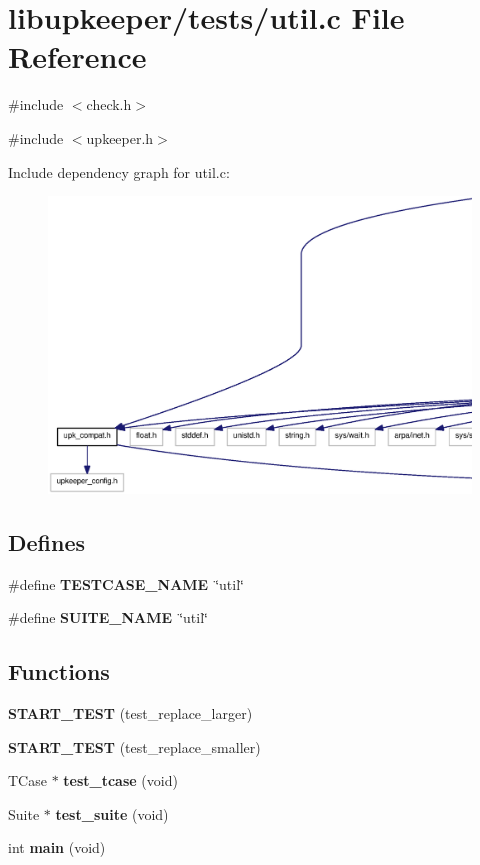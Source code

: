 \section{libupkeeper/tests/util.c File Reference}
\label{util_8c}
{\ttfamily \#include $<$check.h$>$}\par
{\ttfamily \#include $<$upkeeper.h$>$}\par
Include dependency graph for util.c:
\nopagebreak
\begin{figure}[H]
\begin{center}
\leavevmode
\includegraphics[width=400pt]{util_8c__incl}
\end{center}
\end{figure}
\subsection*{Defines}
\begin{DoxyCompactItemize}
\item 
\#define {\bf TESTCASE\_\-NAME}~\char`\"{}util\char`\"{}
\item 
\#define {\bf SUITE\_\-NAME}~\char`\"{}util\char`\"{}
\end{DoxyCompactItemize}
\subsection*{Functions}
\begin{DoxyCompactItemize}
\item 
{\bf START\_\-TEST} (test\_\-replace\_\-larger)
\item 
{\bf START\_\-TEST} (test\_\-replace\_\-smaller)
\item 
TCase $\ast$ {\bf test\_\-tcase} (void)
\item 
Suite $\ast$ {\bf test\_\-suite} (void)
\item 
int {\bf main} (void)
\end{DoxyCompactItemize}
